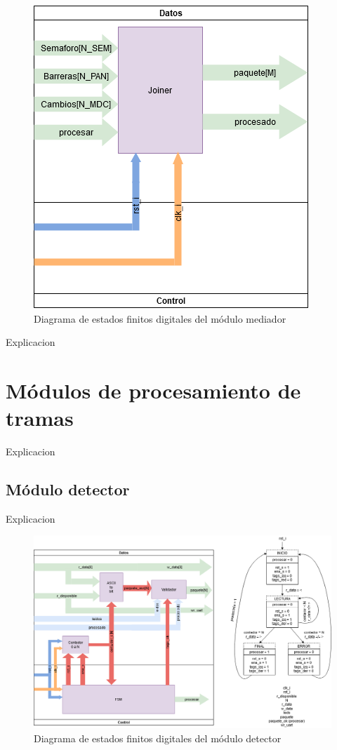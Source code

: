 		\begin{figure}[h]
		\centering
			\includegraphics[scale=.3]{./Figures/FSMD-Mediador}
			\caption{Diagrama de estados finitos digitales del módulo mediador}
			\label{fig:FSMD_Mediador}
		\end{figure}
		
		Explicacion 
		
\section{Módulos de procesamiento de tramas}

	Explicacion 
	
	\subsection{Módulo detector}
	
		Explicacion 
		
		\begin{figure}[h]
		\centering
			\includegraphics[scale=.3]{./Figures/FSMD-Detector}
			\caption{Diagrama de estados finitos digitales del módulo detector}
			\label{fig:FSMD_Detector}
		\end{figure}
		
